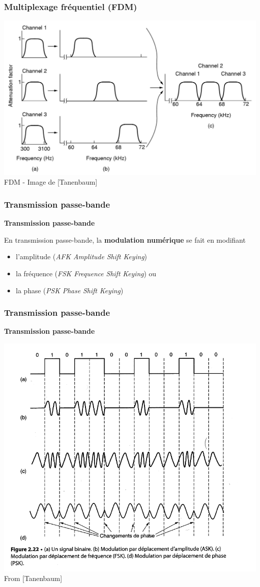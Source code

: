 \begin{frame}[fragile]
  \frametitle{Multiplexage fréquentiel (FDM)}
\begin{center}
	\includegraphics[width=.7\linewidth]{img/2-24.jpg}\\
	{\scriptsize FDM - Image de [Tanenbaum]}
\end{center}
\end{frame}

\begin{frame}[fragile]
	\frametitle{Transmission passe-bande}
{\large\bf Transmission passe-bande}
\par
En transmission passe-bande, la \textbf{modulation numérique} se fait en modifiant
\begin{itemize}
	\item l'amplitude (\textit{AFK Amplitude Shift Keying})
	\item la fréquence (\textit{FSK Frequence Shift Keying}) ou
	\item la phase (\textit{PSK Phase Shift Keying})
\end{itemize}
\end{frame}

\begin{frame}[fragile]
	\frametitle{Transmission passe-bande}
{\large\bf Transmission passe-bande}
\begin{center}
	\includegraphics[width=.64\linewidth]{img/2-22.png} \\
	{\scriptsize From [Tanenbaum]}
\end{center}
\end{frame}

